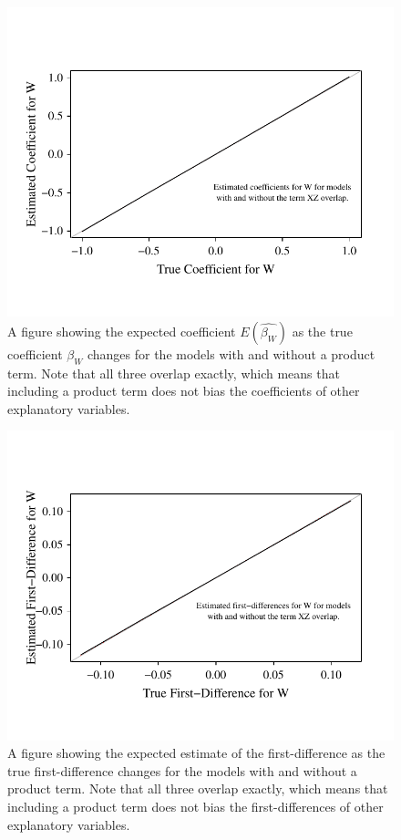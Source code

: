\documentclass[12pt]{article}
\begin{document}
\begin{appendix}
\begin{figure}[H]
\begin{center}
\includegraphics[scale = .8]{fig/fig-w-est.pdf}
\end{center}\caption{A figure showing the expected coefficient $E(\hat{\beta_W})$ as the true coefficient $\beta_W$ changes for the models with and without a product term. Note that all three overlap exactly, which means that including a product term does not bias the coefficients of other explanatory variables.}\label{fig:w-est}
\end{figure}

\begin{figure}[H]
\begin{center}
\includegraphics[scale = .8]{fig/fig-w-fd.pdf}
\end{center}\caption{A figure showing the expected estimate of the first-difference as the true first-difference changes for the models with and without a product term. Note that all three overlap exactly, which means that including a product term does not bias the first-differences of other explanatory variables.}\label{fig:w-fd}
\end{figure}


\end{appendix}
\end{document}
